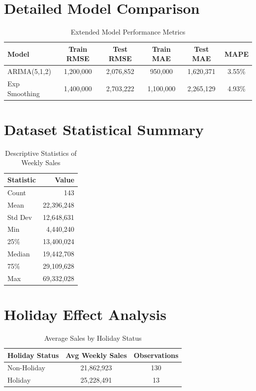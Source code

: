 \documentclass[12pt,a4paper]{report}
\begin{document}
\section{Detailed Model Comparison}

\begin{table}[H]
\centering
\caption{Extended Model Performance Metrics}
\begin{tabular}{lccccc}
\toprule
\textbf{Model} & \textbf{Train RMSE} & \textbf{Test RMSE} & \textbf{Train MAE} & \textbf{Test MAE} & \textbf{MAPE} \\
\midrule
ARIMA(5,1,2) & 1,200,000 & 2,076,852 & 950,000 & 1,620,371 & 3.55\% \\
Exp Smoothing & 1,400,000 & 2,703,222 & 1,100,000 & 2,265,129 & 4.93\% \\
\bottomrule
\end{tabular}
\end{table}

\section{Dataset Statistical Summary}

\begin{table}[H]
\centering
\caption{Descriptive Statistics of Weekly Sales}
\begin{tabular}{lr}
\toprule
\textbf{Statistic} & \textbf{Value} \\
\midrule
Count & 143 \\
Mean & 22,396,248 \\
Std Dev & 12,648,631 \\
Min & 4,440,240 \\
25\% & 13,400,024 \\
Median & 19,442,708 \\
75\% & 29,109,628 \\
Max & 69,332,028 \\
\bottomrule
\end{tabular}
\end{table}

\section{Holiday Effect Analysis}

\begin{table}[H]
\centering
\caption{Average Sales by Holiday Status}
\begin{tabular}{lcc}
\toprule
\textbf{Holiday Status} & \textbf{Avg Weekly Sales} & \textbf{Observations} \\
\midrule
Non-Holiday & 21,862,923 & 130 \\
Holiday & 25,228,491 & 13 \\
\bottomrule
\end{tabular}
\end{table}
\end{document}
